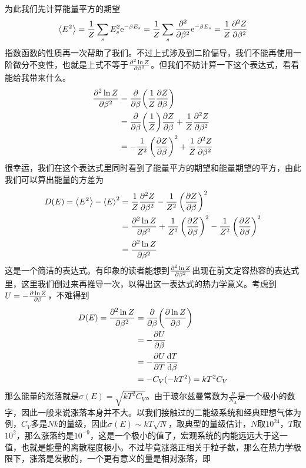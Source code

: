 \documentclass[../../main.tex]{subfiles}
\begin{document}
为此我们先计算能量平方的期望
\begin{equation}
    \expval{E^2}=\frac{1}{Z}\sum_s E_s^2\mathrm{e}^{-\beta E_s}=\frac{1}{Z}\sum_s \pdv[2]{\beta}\mathrm{e}^{-\beta E_s}=\frac{1}{Z}\pdv[2]{Z}{\beta}
\end{equation}
指数函数的性质再一次帮助了我们。不过上式涉及到二阶偏导，我们不能再使用一阶微分不变性，也就是上式不等于\(\pdv[2]{\ln Z}{\beta}\)。但我们不妨计算一下这个表达式，看看能给我带来什么。
\begin{equation}
    \begin{split}
    \pdv[2]{\ln Z}{\beta}&=\pdv{\beta}(\frac{1}{Z}\pdv{Z}{\beta}) \\
    &=\pdv{\beta}(\frac{1}{Z})\pdv{Z}{\beta}+\frac{1}{Z}\pdv[2]{Z}{\beta} \\
    &=-\frac{1}{Z^2}\left(\pdv{Z}{\beta}\right)^2+\frac{1}{Z}\pdv[2]{Z}{\beta}
    \end{split}
\end{equation}
很幸运，我们在这个表达式里同时看到了能量平方的期望和能量期望的平方，由此我们可以算出能量的方差为
\begin{equation}
    \begin{split}
        D(E)=\expval{E^2}-\expval{E}^2&=\frac{1}{Z}\pdv[2]{Z}{\beta}-\frac{1}{Z^2}\left(\pdv{Z}{\beta}\right)^2 \\
        &=\pdv[2]{\ln Z}{\beta}+\frac{1}{Z^2}\left(\pdv{Z}{\beta}\right)^2-\frac{1}{Z^2}\left(\pdv{Z}{\beta}\right)^2 \\
        &=\pdv[2]{\ln Z}{\beta}
    \end{split}
\end{equation}
这是一个简洁的表达式。有印象的读者能想到\(\pdv[2]{\ln Z}{\beta}\)出现在前文定容热容的表达式里，这里我们倒过来再推导一次，以得出这一表达式的热力学意义。考虑到\(U=-\pdv{\ln Z}{\beta}\)，不难得到
\begin{equation}
    \begin{split}
        D(E)=\pdv[2]{\ln Z}{\beta}&=\pdv{\beta}(\pdv{\ln Z}{\beta}) \\
        &=-\pdv{U}{\beta} \\
        &=-\pdv{U}{T}\dv{T}{\beta} \\
        &=-C_V(-kT^2)=kT^2C_V
    \end{split}
\end{equation}
那么能量的涨落就是\(\sigma(E)=\sqrt{kT^2C_V}\)。由于玻尔兹曼常数为\(\frac{R}{N_A}\)是一个极小的数字，因此一般来说涨落本身并不大。以我们接触过的二能级系统和经典理想气体为例，\(C_V\)多是\(Nk\)的量级，因此\(\sigma(E)\sim kT\sqrt{N}\)，取典型的量级估计，\(N\)取\(10^{24}\)，\(T\)取\(10^{2}\)，那么涨落约是\(10^{-9}\)，这是一个极小的值了，宏观系统的内能远远大于这一值，也就是能量的离散程度极小。不过毕竟涨落正相关于粒子数，那么在热力学极限下，涨落是发散的，一个更有意义的量是相对涨落，即
\end{document}
